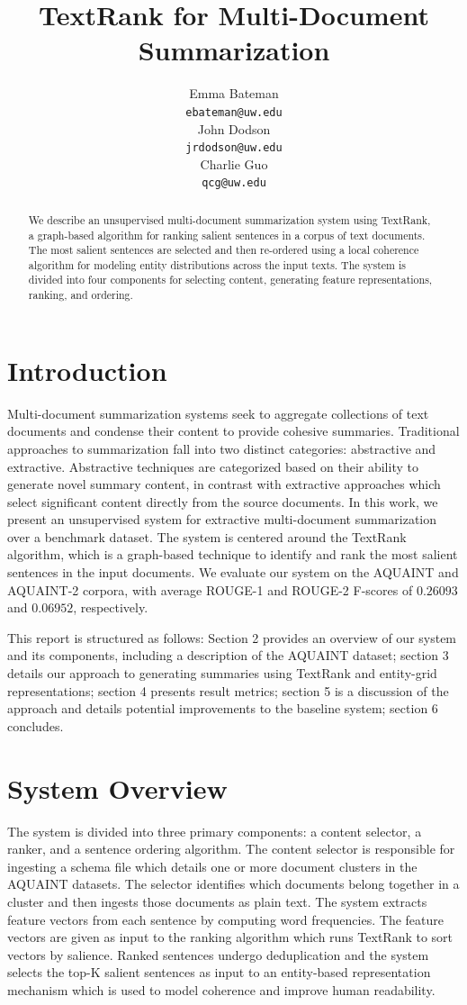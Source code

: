 \documentclass[11pt]{article}
\title{TextRank for Multi-Document Summarization}
\author{Emma Bateman \\
  {\tt ebateman@uw.edu} \\\And
  John Dodson \\
  {\tt jrdodson@uw.edu} \\\And
  Charlie Guo \\
  {\tt qcg@uw.edu}
  }
\date{}
\begin{document}
\maketitle
\begin{abstract}
We describe an unsupervised multi-document summarization system using TextRank, a graph-based algorithm for ranking salient sentences in a corpus of text documents. The most salient sentences are selected and then re-ordered using a local coherence algorithm for modeling entity distributions across the input texts. The system is divided into four components for selecting content, generating feature representations, ranking, and ordering.
\end{abstract}

\section{Introduction}

Multi-document summarization systems seek to aggregate collections of text documents and condense their content to provide cohesive summaries. Traditional approaches to summarization fall into two distinct categories: abstractive and extractive. Abstractive techniques are categorized based on their ability to generate novel summary content, in contrast with extractive approaches which select significant content directly from the source documents. In this work, we present an unsupervised system for extractive multi-document summarization over a benchmark dataset. The system is centered around the TextRank algorithm, which is a graph-based technique to identify and rank the most salient sentences in the input documents. We evaluate our system on the AQUAINT and AQUAINT-2 corpora, with average ROUGE-1 and ROUGE-2 F-scores of $0.26093$ and $0.06952$, respectively. 

This report is structured as follows: Section 2 provides an overview of our system and its components, including a description of the AQUAINT dataset; section 3 details our approach to generating summaries using TextRank and entity-grid representations; section 4 presents result metrics; section 5 is a discussion of the approach and details potential improvements to the baseline system; section 6 concludes.

\section{System Overview}
The system is divided into three primary components: a content selector, a ranker, and a sentence ordering algorithm. The content selector is responsible for ingesting a schema file which details one or more document clusters in the AQUAINT datasets. The selector identifies which documents belong together in a cluster and then ingests those documents as plain text. The system extracts feature vectors from each sentence by computing word frequencies. The feature vectors are given as input to the ranking algorithm which runs TextRank to sort vectors by salience. Ranked sentences undergo deduplication and the system selects the top-K salient sentences as input to an entity-based representation mechanism which is used to model coherence and improve human readability.
\end{document}
